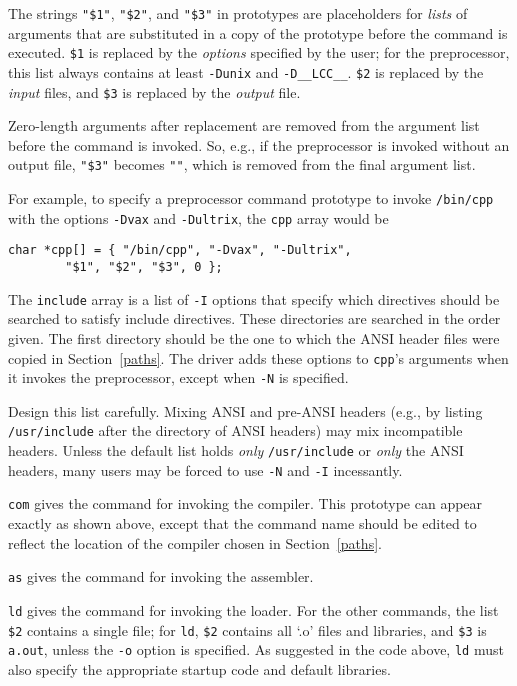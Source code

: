 The strings \verb|"$1"|, \verb|"$2"|, and \verb|"$3"| in
prototypes are placeholders for {\em lists} of arguments that
are substituted in a copy of the prototype before the command is executed.
\verb|$1| is replaced by the {\em options} specified by the user;
for the preprocessor, this list always contains at least
\verb|-Dunix| and \verb|-D__LCC__|.
\verb|$2| is replaced by the {\em input} files,
and \verb|$3| is replaced by the {\em output} file.

Zero-length arguments after replacement are removed from
the argument list before the command is invoked. So, e.g.,
if the preprocessor is invoked without an output file,
\verb|"$3"| becomes \verb|""|, which is removed from the final argument list.

For example, to specify a preprocessor command prototype to invoke
\verb|/bin/cpp| with the options \verb|-Dvax| and \verb|-Dultrix|,
the \verb|cpp| array would be
\begin{verbatim}
char *cpp[] = { "/bin/cpp", "-Dvax", "-Dultrix",
        "$1", "$2", "$3", 0 };
\end{verbatim}

The \verb|include| array is a list of \verb|-I| options that
specify which directives should be searched to satisfy include directives.
These directories are searched in the order given.
The first directory should be the one to which the ANSI
header files were copied in Section~\ref{paths}.
The driver adds these options to \verb|cpp|'s arguments
when it invokes the preprocessor, except when \verb|-N| is specified.

Design this list carefully.  Mixing ANSI and pre-ANSI headers (e.g., by
listing \verb|/usr/include| after the directory of ANSI headers) may
mix incompatible headers.  Unless the default list holds {\em only}
\verb|/usr/include| or {\em only} the ANSI headers, many users may be
forced to use \verb|-N| and \verb|-I| incessantly.

\verb|com| gives the command for invoking the compiler.
This prototype can appear exactly as shown above, except
that the command name should be edited to reflect the
location of the compiler chosen in Section~\ref{paths}.

\verb|as| gives the command for invoking the assembler.

\verb|ld| gives the command for invoking the loader.
For the other commands, the list \verb|$2| contains a single file;
for \verb|ld|, \verb|$2| contains all `.o' files and libraries, and
\verb|$3| is \verb|a.out|, unless the \verb|-o| option is specified.
As suggested in the code above, \verb|ld| must also specify
the appropriate startup code and default libraries.

